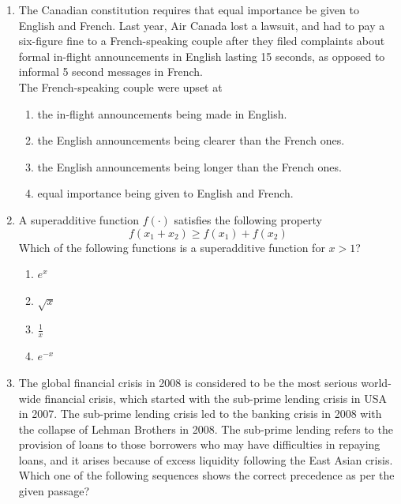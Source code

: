 \documentclass[journal,12pt,onecolumn]{IEEEtran}
\begin{document}
\begin{enumerate}
\item The Canadian constitution requires that equal importance be given to English and French. Last year, Air Canada lost a lawsuit, and had to pay a six-figure fine to a French-speaking couple after they filed complaints about formal in-flight announcements in English lasting 15 seconds, as opposed to informal 5 second messages in French. \\
The French-speaking couple were upset at

\hfill{}
\begin{enumerate}
    \item the in-flight announcements being made in English.
    \item the English announcements being clearer than the French ones.
    \item the English announcements being longer than the French ones.
    \item equal importance being given to English and French.
\end{enumerate}

\item A superadditive function $f(\cdot)$ satisfies the following property
$$f(x_{1}+x_{2})\ge f(x_{1})+f(x_{2})$$
Which of the following functions is a superadditive function for $x>1$?

\hfill{}
\begin{multicols}{4}
\begin{enumerate}
    \item $e^{x}$
    \item $\sqrt{x}$
    \item $\frac{1}{x}$
    \item $e^{-x}$
\end{enumerate}
\end{multicols}





\item The global financial crisis in 2008 is considered to be the most serious world-wide financial crisis, which started with the sub-prime lending crisis in USA in 2007. The sub-prime lending crisis led to the banking crisis in 2008 with the collapse of Lehman Brothers in 2008. The sub-prime lending refers to the provision of loans to those borrowers who may have difficulties in repaying loans, and it arises because of excess liquidity following the East Asian crisis. \\
Which one of the following sequences shows the correct precedence as per the given passage?


\end{enumerate}
\end{document}
